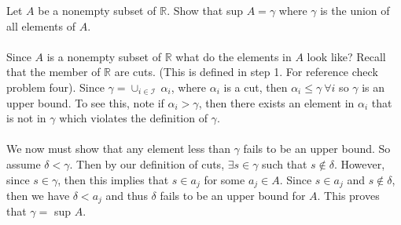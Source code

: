 \documentclass[12pt]{article}
\begin{document}
\problem 
Let $A$ be a nonempty subset of $\mathbb{R}$. Show that sup $A = \gamma$ where $\gamma$ is the union of all elements of $A$. \\ \\
Since $A$ is a nonempty subset of $\mathbb{R}$ what do the elements in $A$ look like? Recall that the member of $\mathbb{R}$ are cuts. (This is defined in step 1. For reference check problem four). Since $\gamma =\cup _{i \in \mathcal{I}}~ \alpha_{i}$, where $\alpha_{i}$ is a cut, then $\alpha_{i} \leq \gamma ~ \forall i$ so $\gamma$ is an upper bound. To see this, note if $\alpha_{i}> \gamma$, then there exists an element in $\alpha_{i}$ that is not in $\gamma$ which violates the definition of $\gamma$.   \\ \\
We now must show that any element less than $\gamma$ fails to be an upper bound. So assume $\delta < \gamma$. Then by our definition of cuts, $\exists s \in \gamma$ such that $s \notin \delta$. However, since $s \in \gamma$, then this implies that $s \in a_{j}$ for some $a_{j} \in A$. Since $s \in a_{j}$ and $s \notin \delta$, then we have $\delta < a_{j}$ and thus $\delta$ fails to be an upper bound for $A$. This proves that $\gamma =$ sup $A$. \\ \\ 
\end{document}
